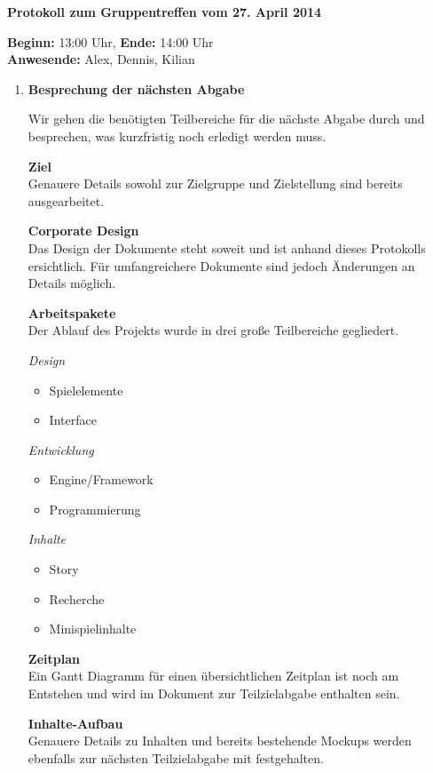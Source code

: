\documentclass[a4paper]{article}
\newcommand{\changefont}[3]{
\fontfamily{#1} \fontseries{#2} \fontshape{#3} \selectfont}
\newcommand{\TOP}[1]{\item \textbf{#1}\par}
\begin{document}
\changefont{cmss}{m}{n} %

\begin{center}
\textbf{\Large Protokoll zum Gruppentreffen vom 27. April 2014}
\end{center}
\vspace{3mm}

\textbf{Beginn:} 13:00 Uhr, \textbf{Ende:} 14:00 Uhr\\
\textbf{Anwesende:} Alex, Dennis, Kilian

\vspace{5mm}

\begin{enumerate}

\TOP{Besprechung der nächsten Abgabe}
Wir gehen die benötigten Teilbereiche für die nächste Abgabe durch und besprechen, was kurzfristig noch erledigt werden muss.

\textbf{Ziel}\\
Genauere Details sowohl zur Zielgruppe und Zielstellung sind bereits ausgearbeitet.

\textbf{Corporate Design}\\
Das Design der Dokumente steht soweit und ist anhand dieses Protokolls ersichtlich. Für umfangreichere Dokumente sind jedoch Änderungen an Details möglich.

\textbf{Arbeitspakete}\\
Der Ablauf des Projekts wurde in drei große Teilbereiche gegliedert.

\textit{Design}
\begin{itemize}
\item Spielelemente
\item Interface
\end{itemize}

\textit{Entwicklung}
\begin{itemize}
\item Engine/Framework
\item Programmierung
\end{itemize}

\textit{Inhalte}
\begin{itemize}
\item Story
\item Recherche
\item Minispielinhalte
\end{itemize}


\textbf{Zeitplan}\\
Ein Gantt Diagramm für einen übersichtlichen Zeitplan ist noch am Entstehen und wird im Dokument zur Teilzielabgabe enthalten sein.

\textbf{Inhalte-Aufbau}\\
Genauere Details zu Inhalten und bereits bestehende Mockups werden ebenfalls zur nächsten Teilzielabgabe mit festgehalten.

\end{enumerate}
\end{document}
